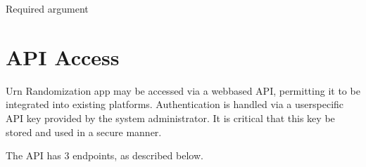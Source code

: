 \documentclass[letterpaper,10pt,english]{sphinxmanual}
\begin{document}
\begin{fulllineitems}
\label{\detokenize{cli:cmdoption-urand-cli.py-upload-participants-arg-INFILE}}
Required argument

\end{fulllineitems}



\chapter{API Access}
\label{\detokenize{api:api-access}}\label{\detokenize{api::doc}}
Urn Randomization app may be accessed via a web\sphinxhyphen{}based API, permitting it to be
integrated into existing platforms. Authentication is handled via a user\sphinxhyphen{}specific API
key provided by the system administrator. It is critical that this key be
stored and used in a secure manner.

The API has 3 endpoints, as described below.
\end{document}
